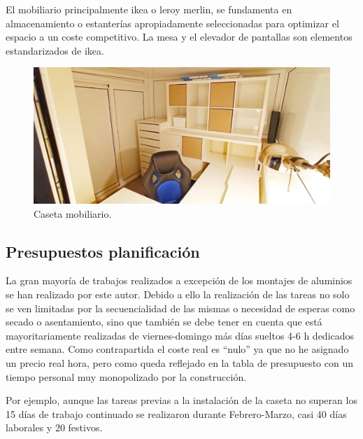 El mobiliario principalmente ikea o leroy merlin, se fundamenta en almacenamiento o estanterías apropiadamente seleccionadas para optimizar el espacio a un coste competitivo. La mesa y el elevador de pantallas son elementos estandarizados de ikea.
\begin{figure}[!htb]
\begin{center}
\includegraphics[width=1\textwidth]{./figuras/mobiliario_interior}
\caption{Caseta mobiliario.}
\label{F:mobiliario_interior}
\end{center}
\end{figure}

\subsection{Presupuestos planificación}

La gran mayoría de trabajos realizados a excepción de los montajes de aluminios se han realizado por este autor. Debido a ello la realización de las tareas no solo se ven limitadas por la secuencialidad de las mismas o necesidad de esperas como secado o asentamiento, sino que también se debe tener en cuenta que está mayoritariamente realizadas de viernes-domingo más días sueltos 4-6 h dedicados entre semana. Como contrapartida el coste real es “nulo” ya que no he asignado un precio real hora, pero como queda reflejado en la tabla de presupuesto con un tiempo personal muy monopolizado por la construcción.

Por ejemplo, aunque las tareas previas a la instalación de la caseta no superan los 15 días de trabajo continuado se realizaron durante Febrero-Marzo, casi 40 días laborales y 20 festivos.

